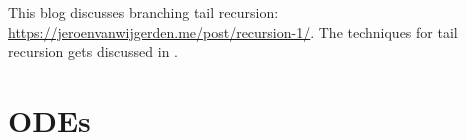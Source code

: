 \documentclass[a4paper,12pt]{article}
\begin{document}

%


\begin{related}
    This blog discusses branching tail recursion:
    \url{https://jeroenvanwijgerden.me/post/recursion-1/}.
    The techniques for tail recursion  gets discussed in \cite{vicini_path_2021}.
\end{related}


\section{ODEs}

%
%
\end{document}

